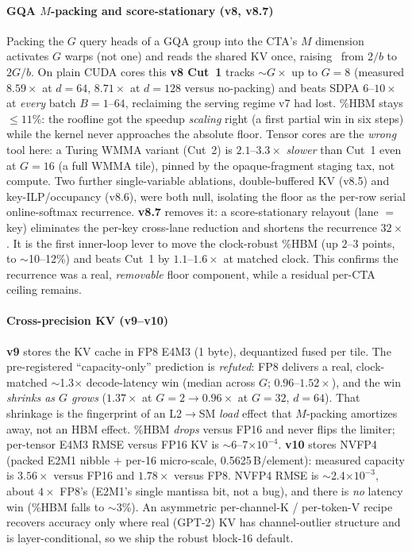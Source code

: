 \paragraph{GQA $M$-packing and score-stationary (v8, v8.7)}
Packing the $G$ query heads of a GQA group into the CTA's $M$ dimension activates
$G$ warps (not one) and reads the shared KV once, raising \ai\ from $2/b$ to
$2G/b$. On plain CUDA cores this \textbf{v8 Cut~1} tracks $\sim G\times$ up to
$G{=}8$ (measured $8.59\times$ at $d{=}64$, $8.71\times$ at $d{=}128$ versus
no-packing) and beats SDPA $6$--$10\times$ at \emph{every} batch $B{=}1$--$64$,
reclaiming the serving regime v7 had lost. \%HBM stays $\le 11\%$: the roofline
got the speedup \emph{scaling} right (a first partial win in six steps) while the
kernel never approaches the absolute floor. Tensor cores are the \emph{wrong}
tool here: a Turing WMMA variant (Cut~2) is $2.1$--$3.3\times$ \emph{slower} than
Cut~1 even at $G{=}16$ (a full WMMA tile), pinned by the opaque-fragment
staging tax, not compute. Two further single-variable ablations, double-buffered
KV (v8.5) and key-ILP/occupancy (v8.6), were both null, isolating the floor as
the per-row serial online-softmax recurrence. \textbf{v8.7} removes it: a
score-stationary relayout (lane $=$ key) eliminates the per-key cross-lane
reduction and shortens the recurrence $32\times$. It is the first inner-loop
lever to move the clock-robust \%HBM (up $2$--$3$ points, to $\sim$10--12\%) and
beats Cut~1 by $1.1$--$1.6\times$ at matched clock. This confirms the recurrence
was a real, \emph{removable} floor component, while a residual per-CTA ceiling
remains.

\paragraph{Cross-precision KV (v9--v10)}
\textbf{v9} stores the KV cache in FP8 E4M3 (1 byte), dequantized fused per tile.
The pre-registered ``capacity-only'' prediction is \emph{refuted}: FP8 delivers a
real, clock-matched $\sim$1.3$\times$ decode-latency win (median across $G$;
$0.96$--$1.52\times$), and the win \emph{shrinks as $G$ grows}
($1.37\times$ at $G{=}2 \to 0.96\times$ at $G{=}32$, $d{=}64$). That shrinkage is
the fingerprint of an L2$\to$SM \emph{load} effect that $M$-packing amortizes
away, not an HBM effect. \%HBM \emph{drops} versus FP16 and never flips the limiter; per-tensor
E4M3 RMSE versus FP16 KV is $\sim$6--7$\times10^{-4}$. \textbf{v10} stores NVFP4
(packed E2M1 nibble $+$ per-16 micro-scale, 0.5625\,B/element): measured capacity
is $3.56\times$ versus FP16 and $1.78\times$ versus FP8. NVFP4 RMSE is
$\sim$2.4$\times10^{-3}$, about $4\times$ FP8's (E2M1's single mantissa bit, not
a bug), and there is \emph{no} latency win (\%HBM falls to $\sim$3\%). An
asymmetric per-channel-K / per-token-V recipe recovers accuracy only where real
(GPT-2) KV has channel-outlier structure and is layer-conditional, so we ship the
robust block-16 default.

